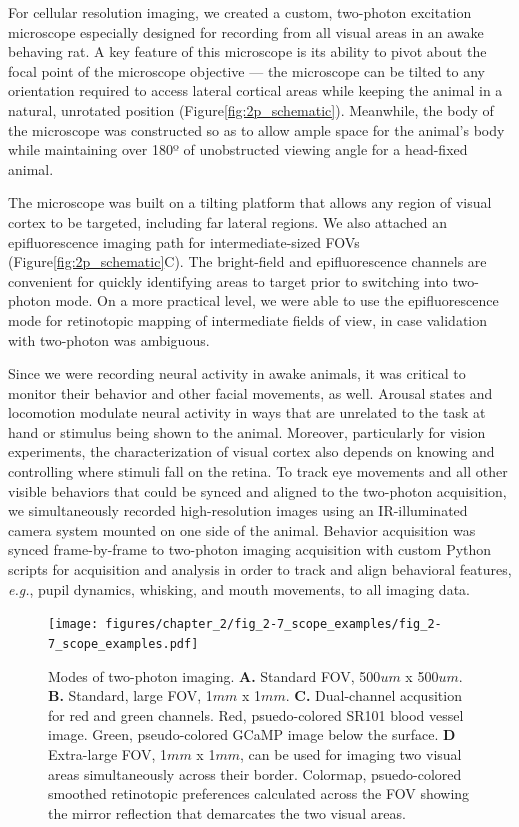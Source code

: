 For cellular resolution imaging, we created a custom, two-photon excitation microscope especially designed for recording from all visual areas in an awake behaving rat. A key feature of this microscope is its ability to pivot about the focal point of the microscope objective --- the microscope can be tilted to any orientation required to access lateral cortical areas while keeping the animal in a natural, unrotated position (Figure\ref{fig:2p_schematic}). Meanwhile, the body of the microscope was constructed so as to allow ample space for the animal's body while maintaining over 180º of unobstructed viewing angle for a head-fixed animal.

The microscope was built on a tilting platform that allows any region of visual cortex to be targeted, including far lateral regions. We also attached an epifluorescence imaging path for intermediate-sized FOVs (Figure\ref{fig:2p_schematic}C). The bright-field and epifluorescence channels are convenient for quickly identifying areas to target prior to switching into two-photon mode. On a more practical level, we were able to use the epifluorescence mode for retinotopic mapping of intermediate fields of view, in case validation with two-photon was ambiguous. 

Since we were recording neural activity in awake animals, it was critical to monitor their behavior and other facial movements, as well. Arousal states and locomotion modulate neural activity in ways that are unrelated to the task at hand or stimulus being shown to the animal. Moreover, particularly for vision experiments, the characterization of visual cortex also depends on knowing and controlling where stimuli fall on the retina. To track eye movements and all other visible behaviors that could be synced and aligned to the two-photon acquisition, we simultaneously recorded high-resolution images using an IR-illuminated camera system mounted on one side of the animal. Behavior acquisition was synced frame-by-frame to two-photon imaging acquisition with custom Python scripts for acquisition and analysis in order to track and align behavioral features, \textit{e.g.}, pupil dynamics, whisking, and mouth movements, to all imaging data.

\begin{figure}[t!]
    \texttt{[image: figures/chapter\_2/fig\_2-7\_scope\_examples/fig\_2-7\_scope\_examples.pdf]}
    \vspace{.1in}
    \caption[Two-photon imaging modes]{Modes of two-photon imaging. \textbf{A.} Standard FOV, 500$um$ x 500$um$. \textbf{B.} Standard, large FOV, 1$mm$ x 1$mm$. \textbf{C.} Dual-channel acqusition for red and green channels. Red, psuedo-colored SR101 blood vessel image. Green, pseudo-colored GCaMP image below the surface. \textbf{D} Extra-large FOV, 1$mm$ x 1$mm$, can be used for imaging two visual areas simultaneously across their border. Colormap, psuedo-colored smoothed retinotopic preferences calculated across the FOV showing the mirror reflection that demarcates the two visual areas. 
    \label{fig:scope_examples}}
\end{figure}

